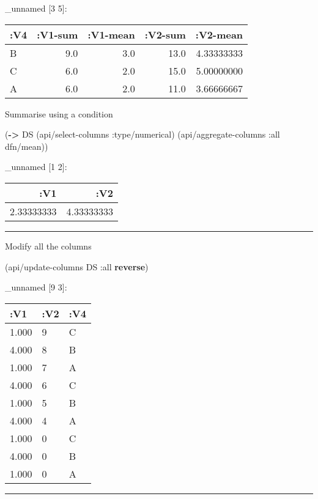 \documentclass[]{article}
\newenvironment{Shaded}{\begin{snugshade}}{\end{snugshade}}
\newcommand{\KeywordTok}[1]{\textcolor[rgb]{0.13,0.29,0.53}{\textbf{#1}}}
\newcommand{\AttributeTok}[1]{\textcolor[rgb]{0.77,0.63,0.00}{#1}}
\newcommand{\NormalTok}[1]{#1}
\begin{document}
\_unnamed {[}3 5{]}:

\begin{longtable}[]{@{}lrrrr@{}}
\toprule
:V4 & :V1-sum & :V1-mean & :V2-sum & :V2-mean\tabularnewline
\midrule
\endhead
B & 9.0 & 3.0 & 13.0 & 4.33333333\tabularnewline
C & 6.0 & 2.0 & 15.0 & 5.00000000\tabularnewline
A & 6.0 & 2.0 & 11.0 & 3.66666667\tabularnewline
\bottomrule
\end{longtable}

Summarise using a condition

\begin{Shaded}
\begin{Highlighting}[]
\NormalTok{(}\KeywordTok{->}\NormalTok{ DS}
\NormalTok{    (api/select-columns }\AttributeTok{:type/numerical}\NormalTok{)}
\NormalTok{    (api/aggregate-columns }\AttributeTok{:all}\NormalTok{ dfn/mean))}
\end{Highlighting}
\end{Shaded}

\_unnamed {[}1 2{]}:

\begin{longtable}[]{@{}rr@{}}
\toprule
:V1 & :V2\tabularnewline
\midrule
\endhead
2.33333333 & 4.33333333\tabularnewline
\bottomrule
\end{longtable}

\begin{center}\rule{0.5\linewidth}{0.5pt}\end{center}

Modify all the columns

\begin{Shaded}
\begin{Highlighting}[]
\NormalTok{(api/update-columns DS }\AttributeTok{:all} \KeywordTok{reverse}\NormalTok{)}
\end{Highlighting}
\end{Shaded}

\_unnamed {[}9 3{]}:

\begin{longtable}[]{@{}lll@{}}
\toprule
:V1 & :V2 & :V4\tabularnewline
\midrule
\endhead
1.000 & 9 & C\tabularnewline
4.000 & 8 & B\tabularnewline
1.000 & 7 & A\tabularnewline
4.000 & 6 & C\tabularnewline
1.000 & 5 & B\tabularnewline
4.000 & 4 & A\tabularnewline
1.000 & 0 & C\tabularnewline
4.000 & 0 & B\tabularnewline
1.000 & 0 & A\tabularnewline
\bottomrule
\end{longtable}

\begin{center}\rule{0.5\linewidth}{0.5pt}\end{center}
\end{document}
